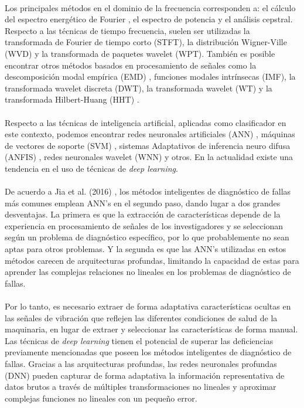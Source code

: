 \documentclass[12pt]{article}%
\begin{document}
\paragraph{}
Los principales métodos en el dominio de la frecuencia corresponden a: el cálculo del espectro energético de Fourier \cite{jia}, el espectro de potencia \cite{li} y el análisis cepstral. Respecto a las  técnicas de tiempo frecuencia, suelen ser utilizadas la transformada de Fourier de tiempo corto (STFT), la distribución Wigner-Ville (WVD) y la transformada de paquetes wavelet (WPT). También es posible encontrar otros métodos basados en procesamiento de señales como la descomposición modal empírica (EMD) \cite{yu}, funciones modales intrínsecas (IMF), la transformada wavelet discreta (DWT), la transformada wavelet (WT) \cite{chang} y la transformada Hilbert-Huang (HHT) \cite{rai}.

\paragraph{}
Respecto a las técnicas de inteligencia artificial, aplicadas como clasificador en este contexto, podemos encontrar redes neuronales artificiales (ANN) \cite{ali}, máquinas de vectores de soporte (SVM) \cite{konar}, sistemas Adaptativos de inferencia neuro difusa (ANFIS) \cite{issam}, redes neuronales wavelet (WNN) \cite{wu} y otros. En la actualidad existe una tendencia en el uso de técnicas de \textit{deep learning}.

\paragraph{}
De acuerdo a Jia et al. (2016) \cite{jia}, los métodos inteligentes de diagnóstico de fallas más comunes emplean ANN's en el segundo paso, dando lugar a dos grandes desventajas. La primera es que la extracción de características depende de la experiencia en procesamiento de señales de los investigadores y se seleccionan según un problema de diagnóstico específico, por lo que probablemente no sean aptas para otros problemas. Y la segunda es que las ANN's utilizadas en estos métodos carecen de arquitecturas profundas, limitando la capacidad de estas para aprender las complejas relaciones no lineales en los problemas de diagnóstico de fallas.

\paragraph{}
Por lo tanto, es necesario extraer de forma adaptativa características ocultas en las señales de vibración que reflejen las diferentes condiciones de salud de la maquinaria, en lugar de extraer y seleccionar las características de forma manual. Las técnicas de \textit{deep learning} tienen el potencial de superar las deficiencias previamente mencionadas que poseen los métodos inteligentes de diagnóstico de fallas. Gracias a las arquitecturas profundas, las redes neuronales profundas (DNN) pueden capturar de forma adaptativa la información representativa de datos brutos a través de múltiples transformaciones no lineales y aproximar complejas funciones no lineales con un pequeño error.
\end{document}
